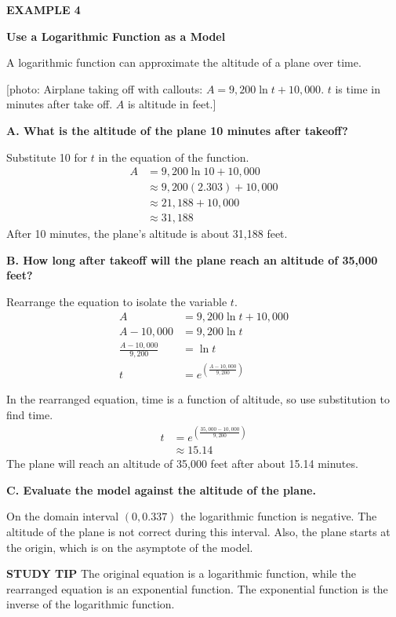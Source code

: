 \documentclass{article}
\newenvironment{concept-box}{}{}
\newenvironment{example}[1]{\textbf{EXAMPLE #1}\par}{\par}
\newcommand{\placeholder}[2]{[#1: #2]}
\begin{document}
\begin{example}{4}
\textbf{Use a Logarithmic Function as a Model}

A logarithmic function can approximate the altitude of a plane over time.

\placeholder{photo}{Airplane taking off with callouts: $A = 9,200 \ln t + 10,000$. $t$ is time in minutes after take off. $A$ is altitude in feet.}

\textbf{A. What is the altitude of the plane 10 minutes after takeoff?}

Substitute 10 for $t$ in the equation of the function.
\begin{align*}
A &= 9,200 \ln 10 + 10,000 \\
&\approx 9,200(2.303) + 10,000 \\
&\approx 21,188 + 10,000 \\
&\approx 31,188
\end{align*}
After 10 minutes, the plane's altitude is about 31,188 feet.

\textbf{B. How long after takeoff will the plane reach an altitude of 35,000 feet?}

Rearrange the equation to isolate the variable $t$.
\begin{align*}
A &= 9,200 \ln t + 10,000 \\
A - 10,000 &= 9,200 \ln t \\
\frac{A - 10,000}{9,200} &= \ln t \\
t &= e^{\left(\frac{A - 10,000}{9,200}\right)}
\end{align*}

In the rearranged equation, time is a function of altitude, so use substitution to find time.
\begin{align*}
t &= e^{\left(\frac{35,000 - 10,000}{9,200}\right)} \\
&\approx 15.14
\end{align*}
The plane will reach an altitude of 35,000 feet after about 15.14 minutes.

\textbf{C. Evaluate the model against the altitude of the plane.}

On the domain interval $(0, 0.337)$ the logarithmic function is negative. The altitude of the plane is not correct during this interval. Also, the plane starts at the origin, which is on the asymptote of the model.

\begin{concept-box}
\textbf{STUDY TIP}
The original equation is a logarithmic function, while the rearranged equation is an exponential function. The exponential function is the inverse of the logarithmic function.
\end{concept-box}
\end{example}
\end{document}
